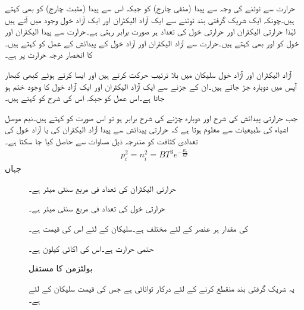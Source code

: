 حرارت سے  ٹوٹنے کی وجہ سے پیدا  (منفی چارج) کو
   جبکہ اس سے پیدا  (مثبت چارج) کو 
  بھی کہتے ہیں۔چونکہ ایک شریک گرفتی بند ٹوٹنے سے ایک آزاد الیکٹران اور ایک آزاد خول وجود میں آتے ہیں لہٰذا حرارتی الیکٹران اور حرارتی خول کی تعداد ہر صورت برابر رہتی ہے۔حرارت سے پیدا الیکٹران اور خول کو   اور   بھی کہتے ہیں۔حرارت سے آزاد الیکٹران اور آزاد خول کے پیدائش کے عمل کو   کہتے ہیں۔  کا انحصار درجہ حرارت پر ہے۔

آزاد الیکٹران اور آزاد خول سلیکان میں بلا ترتیب حرکت کرتے ہیں اور ایسا کرتے ہوئے کبھی کبھار آپس میں دوبارہ جڑ جاتے ہیں۔ان کے جڑنے سے ایک آزاد الیکٹران اور ایک آزاد خول کا وجود ختم ہو جاتا ہے۔اس عمل کو   جبکہ اس کی شرح کو  کہتے ہیں۔

جب حرارتی پیدائش کی شرح اور دوبارہ چڑنے کی شرح برابر ہو تو اس صورت کو  کہتے ہیں۔نیم موصل اشیاء کی طبیعیات سے معلوم ہوتا ہے کہ حرارتی پیدائش سے پیدا آزاد الیکٹران کی    یا آزاد خول کی تعدادی کثافت   کو مندرجہ ذیل مساوات سے حاصل کیا جا سکتا ہے۔
\begin{align} \label{مساوات_ڈایوڈ_حرارتی_توازن_میں_تعدادی_کثافت}
p_i^{2}=n_i^{2}=B T^{3} e^{-\frac{E_{\sigma}}{k T}}
\end{align}
جہاں
\begin{description}
\item
[ ] حرارتی الیکٹران کی تعداد فی مربع سنٹی میٹر ہے۔
\item
[  ] حرارتی خول کی تعداد فی مربع سنٹی میٹر ہے۔
\item
[ ] کی مقدار ہر عنصر کے لئے مختلف ہے۔سلیکان کے لئے اس کی قیمت  ہے۔
\item
[] حتمی حرارت ہے۔اس کی اکائی کیلون  ہے۔
\item
[ ]  بولٹزمن کا مستقل 
\item
[]  یہ شریک گرفتی بند منقطع کرنے کے لئے درکار توانائی ہے جس کی قیمت سلیکان کے لئے  ہے۔
\end{description}



